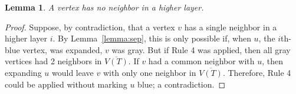 \documentclass[12pt]{article}
\newtheorem{lemma}[theorem]{Lemma}
\begin{document}
\begin{lemma}
  A vertex has no neighbor in a higher layer.
\end{lemma}

\begin{proof}
  Suppose, by contradiction, that a vertex $v$ has a single neighbor in a higher layer $i$.
  By Lemma~\ref{lemma:sep}, this is only possible if, when $u$, the $i$th-blue vertex, was expanded, $v$ was gray.
  But if Rule 4 was applied, then all gray vertices had 2 neighbors in $\overline{V(T)}$.
  If $v$ had a common neighbor with $u$, then expanding $u$ would leave $v$ with only one neighbor in $\overline{V(T)}$.
  Therefore, Rule 4 could be applied without marking $u$ blue; a contradiction.
\end{proof}
\end{document}
